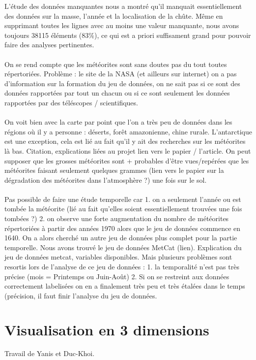 \documentclass[12pt]{article}
\begin{document}
L'étude des données manquantes nous a montré qu'il manquait essentiellement des données sur la masse, l'année et la localisation de la chûte. Même en supprimant toutes les lignes avec au moins une valeur manquante, nous avons toujours 38115 éléments (83\%), ce qui est a priori suffisament grand pour pouvoir faire des analyses pertinentes.\\
\\
On se rend compte que les météorites sont sans doutes pas du tout toutes répertoriées. Problème : le site de la NASA (et ailleurs sur internet) on a pas d'information sur la formation du jeu de données, on ne sait pas si ce sont des données rapportées par tout un chacun ou si ce sont seulement les données rapportées par des téléscopes / scientifiques.\\
\\
On voit bien avec la carte par point que l'on a très peu de données dans les régions où il y a personne : déserts, forêt amazonienne, chine rurale. L'antarctique est une exception, cela est lié au fait qu'il y ait des recherches sur les météorites là bas. Citation, explications liées au projet lien vers le papier / l'article. On peut supposer que les grosses météorites sont + probables d'être vues/repérées que les météorites faisant seulement quelques grammes (lien vers le papier sur la dégradation des météorites dans l'atmosphère ?) une fois sur le sol.\\
\\
Pas possible de faire une étude temporelle car 1. on a seulement l'année ou est tombée la météorite (lié au fait qu'elles soient essentiellement trouvées une fois tombées ?) 2. on observe une forte augmentation du nombre de météorites répertoriées à partir des années 1970 alors que le jeu de données commence en 1640. On a alors cherché un autre jeu de données plus complet pour la partie temporelle. Nous avons trouvé le jeu de données MetCat (lien). Explication du jeu de données metcat, variables disponibles. Mais plusieurs problèmes sont resortis lors de l'analyse de ce jeu de données : 1. la temporalité n'est pas très précise (mois =  Printemps ou Juin-Août) 2. Si on se restreint aux données correctement labelisées on en a finalement très peu et très étalées dans le temps (précision, il faut finir l'analyse du jeu de données.


\section{Visualisation en 3 dimensions}
Travail de Yanis et Duc-Khoi.
\end{document}
